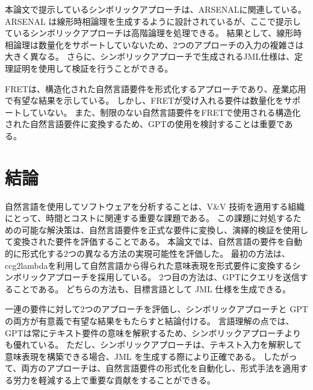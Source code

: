 \documentclass[uplatex, twocolumn, 10pt]{jsarticle} %
\begin{document}
本論文で提示しているシンボリックアプローチは、ARSENAL\cite{16}に関連している。
ARSENAL は線形時相論理を生成するように設計されているが、ここで提示しているシンボリックアプローチは高階論理を処理できる。
結果として、線形時相論理は数量化をサポートしていないため、2つのアプローチの入力の複雑さは大きく異なる。
さらに、シンボリックアプローチで生成されるJML仕様は、定理証明を使用して検証を行うことができる。

FRET\cite{17}は、構造化された自然言語要件を形式化するアプローチであり、産業応用で有望な結果を示している。
しかし、FRETが受け入れる要件は数量化をサポートしていない。
また、制限のない自然言語要件をFRETで使用される構造化された自然言語要件に変換するため、GPTの使用を検討することは重要である。

\section{結論}
\label{sec:conclusion}
自然言語を使用してソフトウェアを分析することは、V\&V 技術を適用する組織にとって、時間とコストに関連する重要な課題である。
この課題に対処するための可能な解決策は、自然言語要件を正式な要件に変換し、演繹的検証を使用して変換された要件を評価することである。
本論文では、自然言語の要件を自動的に形式化する2つの異なる方法の実現可能性を評価した。
最初の方法は、ccg2lambda\cite{3}を利用して自然言語から得られた意味表現を形式要件に変換するシンボリックアプローチを採用している。
2つ目の方法は、GPT\cite{2}にクエリを送信することである。
どちらの方法も、目標言語として JML 仕様を生成できる。

一連の要件に対して2つのアプローチを評価し、シンボリックアプローチと GPT の両方が有意義で有望な結果をもたらすと結論付ける。
言語理解の点では、GPTは常にテキスト要件の意味を解釈するため、シンボリックアプローチよりも優れている。
ただし、シンボリックアプローチは、テキスト入力を解釈して意味表現を構築できる場合、JML を生成する際により正確である。
したがって、両方のアプローチは、自然言語要件の形式化を自動化し、形式手法を適用する労力を軽減する上で重要な貢献をすることができる。
\end{document}
